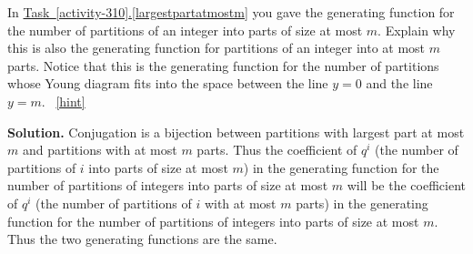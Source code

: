\documentclass{book}
\begin{document}
\setcounter{project}{318}
\addtocounter{project}{-1}
\begin{activity}[]\label{atmostmparts}
\hypertarget{p-1641}{}%
In \hyperref[largestpartatmostm]{Task~\ref{activity-310}.\ref{largestpartatmostm}} you gave the generating function for the number of partitions of an integer into parts of size at most \(m\). Explain why this is also the generating function for partitions of an integer into at most \(m\) parts. Notice that this is the generating function for the number of partitions whose Young diagram fits into the space between the line \(y=0\) and the line \(y=m\).%
~\hfill{\tiny\hyperlink{a-318}{[hint]}\hypertarget{q-318}{}}\par\smallskip%
\noindent\textbf{Solution.}\hypertarget{solution-248}{}\quad%
\hypertarget{p-1643}{}%
Conjugation is a bijection between partitions with largest part at most \(m\) and partitions with at most \(m\) parts. Thus the coefficient of \(q^i\) (the number of partitions of \(i\) into parts of size at most \(m\)) in the generating function for the number of partitions of integers into parts of size at most \(m\) will be the coefficient of \(q^i\) (the number of partitions of \(i\) with at most \(m\) parts) in the generating function for the number of partitions of integers into parts of size at most \(m\). Thus the two generating functions are the same.%
\end{activity}
\end{document}
